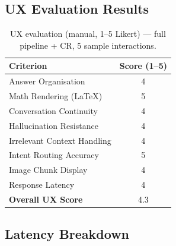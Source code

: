 \documentclass[12pt,a4paper]{article}
\begin{document}
\subsection{UX Evaluation Results}

\begin{table}[H]
  \centering
  \caption{UX evaluation (manual, 1--5 Likert) — full pipeline + CR, 5 sample interactions.}
  \label{tab:ux_results}
  \begin{tabular}{lc}
    \toprule
    \textbf{Criterion} & \textbf{Score (1--5)} \\
    \midrule
    Answer Organisation              & 4 \\
    Math Rendering (LaTeX)           & 5 \\
    Conversation Continuity          & 4 \\
    Hallucination Resistance         & 4 \\
    Irrelevant Context Handling      & 4 \\
    Intent Routing Accuracy          & 5 \\
    Image Chunk Display              & 4 \\
    Response Latency                 & 4 \\
    \midrule
    \textbf{Overall UX Score}        & 4.3 \\
    \bottomrule
  \end{tabular}
\end{table}

\subsection{Latency Breakdown}
\end{document}
